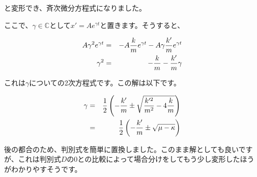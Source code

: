 と変形でき、斉次微分方程式になりました。

ここで、$\gamma \in \mathbb{C}$として$x'=Ae^{\gamma t}$と置きます。そうすると、

\begin{eqnarray}
    A\gamma^2e^{\gamma t} &=& -A\frac{k}{m}e^{\gamma t} - A\gamma\frac{k'}{m}e^{\gamma t} \notag \\
    \gamma^2 &=& -\frac{k}{m} - \frac{k'}{m}\gamma \notag 
\end{eqnarray}

これは$\gamma$についての2次方程式です。この解は以下です。

\begin{eqnarray}
    \gamma &=& \frac{1}{2}\left(-\frac{k'}{m} \pm \sqrt{\frac{k'^2}{m^2}-4\frac{k}{m}}\right) \notag \\
           &=& \frac{1}{2}\left(-\frac{k'}{m} \pm \sqrt{\mu-\kappa}\right) \notag
\end{eqnarray}

後の都合のため、判別式を簡単に置換しました。このまま解としても良いですが、これは判別式$D$の$0$との比較によって場合分けをしてもう少し変形したほうがわかりやすそうです。

